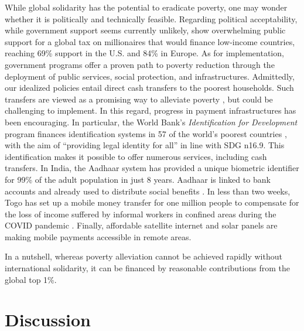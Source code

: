 \documentclass[12pt,english]{article}
\begin{document}
While global solidarity has the potential to eradicate poverty, one may wonder whether it is politically and technically feasible. 
Regarding political acceptability, while government support seems currently unlikely, \cite{fabre_international_2023} show overwhelming public support for a global tax on millionaires that would finance low-income countries, reaching 69\% support in the U.S. and 84\% in Europe. %
As for implementation, government programs offer a proven path to poverty reduction through the deployment of public services, social protection, and infrastructures. 
Admittedly, our idealized policies entail direct cash transfers to the poorest households. Such transfers are viewed as a promising way to alleviate poverty \citep{haushofer_short-term_2016,egger_general_2022}, but could be challenging to implement. In this regard, progress in payment infrastructures has been encouraging. In particular, the World Bank's \textit{Identification for Development} program finances identification systems in 57 of the world's poorest countries \citep{world_bank_state_2017,world_bank_benin_2020,world_bank_identification_2022}, with the aim of ``providing legal identity for all'' in line with SDG n\textdegree{}16.9. This identification makes it possible to offer numerous services, including cash transfers. In India, the Aadhaar system has provided a unique biometric identifier for 99\% of the adult population in just 8 years. Aadhaar is linked to bank accounts and already used to distribute social benefits \citep{muralidharan_identity_2023}. In less than two weeks, Togo has set up a mobile money transfer for one million people to compensate for the loss of income suffered by informal workers in confined areas during the COVID pandemic \citep{ipa_togos_2021}. Finally, affordable satellite internet and solar panels are making mobile payments accessible in remote areas. %

In a nutshell, whereas poverty alleviation cannot be achieved rapidly without international solidarity, it can be financed by reasonable contributions from the global top 1\%.

\section{Discussion\label{sec:conclusion}} 
\end{document}
